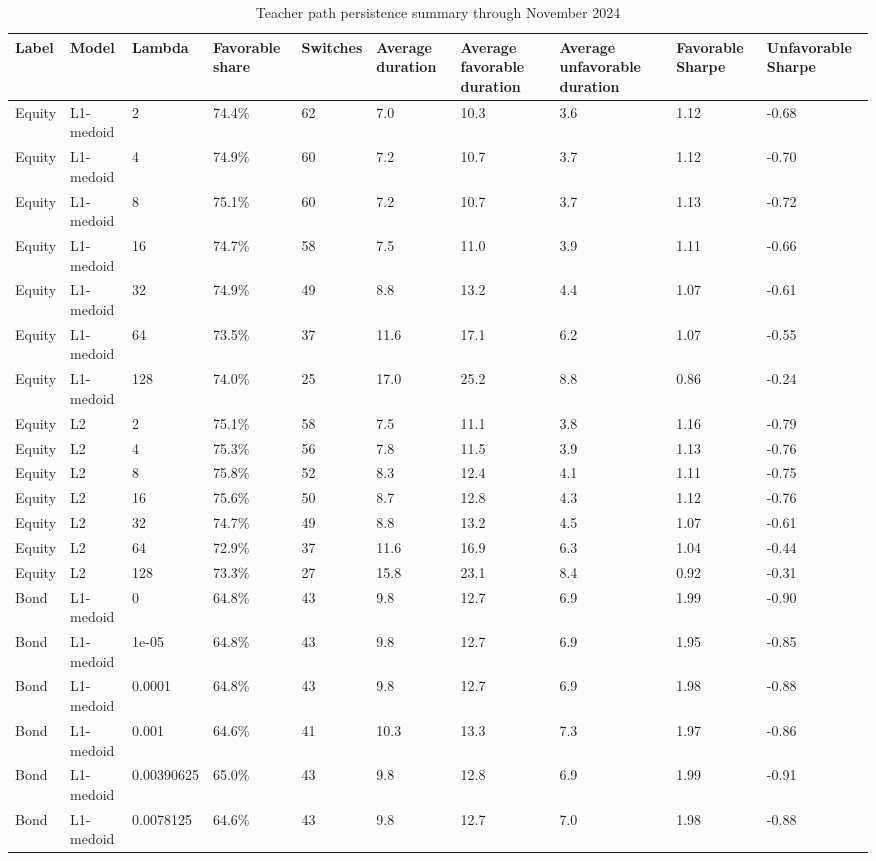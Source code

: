 \begin{table}[!htbp]
\centering
\caption{Teacher path persistence summary through November 2024}
\small
\begin{tabular}{llllllllll}
\toprule
Label & Model & Lambda & Favorable share & Switches & Average duration & Average favorable duration & Average unfavorable duration & Favorable Sharpe & Unfavorable Sharpe \\
\midrule
Equity & L1-medoid & 2 & 74.4\% & 62 & 7.0 & 10.3 & 3.6 & 1.12 & -0.68 \\
Equity & L1-medoid & 4 & 74.9\% & 60 & 7.2 & 10.7 & 3.7 & 1.12 & -0.70 \\
Equity & L1-medoid & 8 & 75.1\% & 60 & 7.2 & 10.7 & 3.7 & 1.13 & -0.72 \\
Equity & L1-medoid & 16 & 74.7\% & 58 & 7.5 & 11.0 & 3.9 & 1.11 & -0.66 \\
Equity & L1-medoid & 32 & 74.9\% & 49 & 8.8 & 13.2 & 4.4 & 1.07 & -0.61 \\
Equity & L1-medoid & 64 & 73.5\% & 37 & 11.6 & 17.1 & 6.2 & 1.07 & -0.55 \\
Equity & L1-medoid & 128 & 74.0\% & 25 & 17.0 & 25.2 & 8.8 & 0.86 & -0.24 \\
Equity & L2 & 2 & 75.1\% & 58 & 7.5 & 11.1 & 3.8 & 1.16 & -0.79 \\
Equity & L2 & 4 & 75.3\% & 56 & 7.8 & 11.5 & 3.9 & 1.13 & -0.76 \\
Equity & L2 & 8 & 75.8\% & 52 & 8.3 & 12.4 & 4.1 & 1.11 & -0.75 \\
Equity & L2 & 16 & 75.6\% & 50 & 8.7 & 12.8 & 4.3 & 1.12 & -0.76 \\
Equity & L2 & 32 & 74.7\% & 49 & 8.8 & 13.2 & 4.5 & 1.07 & -0.61 \\
Equity & L2 & 64 & 72.9\% & 37 & 11.6 & 16.9 & 6.3 & 1.04 & -0.44 \\
Equity & L2 & 128 & 73.3\% & 27 & 15.8 & 23.1 & 8.4 & 0.92 & -0.31 \\
Bond & L1-medoid & 0 & 64.8\% & 43 & 9.8 & 12.7 & 6.9 & 1.99 & -0.90 \\
Bond & L1-medoid & 1e-05 & 64.8\% & 43 & 9.8 & 12.7 & 6.9 & 1.95 & -0.85 \\
Bond & L1-medoid & 0.0001 & 64.8\% & 43 & 9.8 & 12.7 & 6.9 & 1.98 & -0.88 \\
Bond & L1-medoid & 0.001 & 64.6\% & 41 & 10.3 & 13.3 & 7.3 & 1.97 & -0.86 \\
Bond & L1-medoid & 0.00390625 & 65.0\% & 43 & 9.8 & 12.8 & 6.9 & 1.99 & -0.91 \\
Bond & L1-medoid & 0.0078125 & 64.6\% & 43 & 9.8 & 12.7 & 7.0 & 1.98 & -0.88 \\

\end{tabular}
\end{table}
